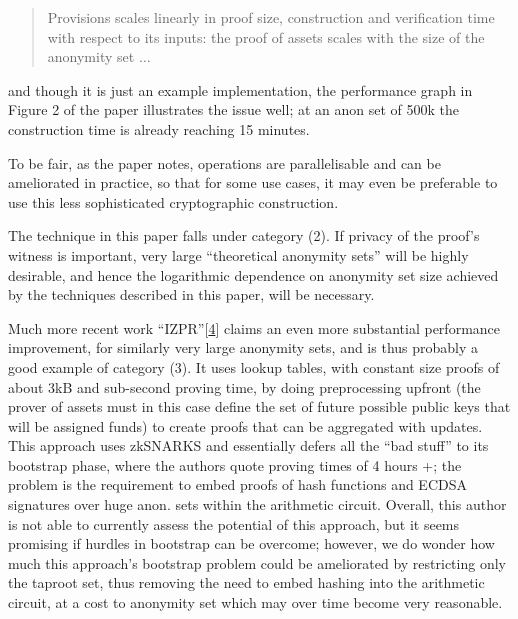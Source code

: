 \documentclass[10pt,a4paper]{article}
\begin{document}
\begin{quote}
Provisions scales linearly in proof size, construction and verification time with respect to its inputs: the proof of assets scales with the size of the anonymity set $\ldots$
\end{quote}

and though it is just an example implementation, the performance graph in Figure 2 of the paper illustrates the issue well; at an anon set of 500k the construction time is already reaching 15 minutes.

\vspace{5 pt}

To be fair, as the paper notes, operations are parallelisable and can be ameliorated in practice, so that for some use cases, it may even be preferable to use this less sophisticated cryptographic construction.

\vspace{5 pt}

The technique in this paper falls under category (2). If privacy of the proof's witness is important, very large ``theoretical anonymity sets'' will be highly desirable, and hence the logarithmic dependence on anonymity set size achieved by the techniques described in this paper, will be necessary.

\vspace{5 pt}

Much more recent work ``IZPR''{[}\protect\hyperlink{anchor-4}{4}{]} claims an even more substantial performance improvement, for similarly very large anonymity sets, and is thus probably a good example of category (3). It uses lookup tables, with constant size proofs of about 3kB and sub-second proving time, by doing preprocessing upfront (the prover of assets must in this case define the set of future possible public keys that will be assigned funds) to create proofs that can be aggregated with updates. This approach uses zkSNARKS and essentially defers all the ``bad stuff'' to its bootstrap phase, where the authors quote proving times of 4 hours +; the problem is the requirement to embed proofs of hash functions and ECDSA signatures over huge anon. sets within the arithmetic circuit. Overall, this author is not able to currently assess the potential of this approach, but it seems promising if hurdles in bootstrap can be overcome; however, we do wonder how much this approach's bootstrap problem could be ameliorated by restricting only the taproot set, thus removing the need to embed hashing into the arithmetic circuit, at a cost to anonymity set which may over time become very reasonable.
\end{document}
